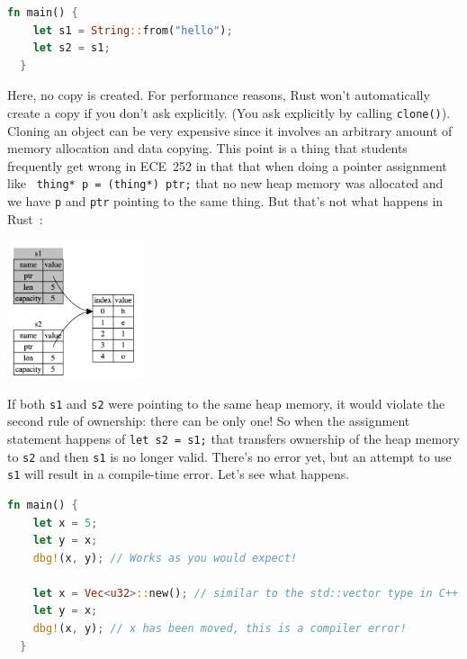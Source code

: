 \begin{lstlisting}[language=Rust]
  fn main() {
    let s1 = String::from("hello");
    let s2 = s1;
  }
\end{lstlisting}

Here, no copy is created. For performance reasons, Rust won't automatically create a copy if you don't ask explicitly. (You ask explicitly by calling \texttt{clone()}). Cloning an object can be very expensive since it involves an arbitrary amount of memory allocation and data copying. This point is a thing that students frequently get wrong in ECE~252 in that that when doing a pointer assignment like \texttt{ thing* p = (thing*) ptr;} that no new heap memory was allocated and we have \texttt{p} and \texttt{ptr} pointing to the same thing. But that's not what happens in Rust~\cite{rustdocs}:

\begin{center}
\includegraphics[width=0.3\textwidth]{images/string-rust.png}
\end{center}

If both \texttt{s1} and \texttt{s2} were pointing to the same heap memory, it would violate the second rule of ownership: there can be only one! So when the assignment statement happens of \texttt{let s2 = s1;} that transfers ownership of the heap memory to \texttt{s2} and then \texttt{s1} is no longer valid. There's no error yet, but an attempt to use \texttt{s1} will result in a compile-time error. Let's see what happens.

\begin{lstlisting}[language=Rust]
  fn main() {
    let x = 5;
    let y = x;
    dbg!(x, y); // Works as you would expect!

    let x = Vec<u32>::new(); // similar to the std::vector type in C++
    let y = x;
    dbg!(x, y); // x has been moved, this is a compiler error!
  }
\end{lstlisting}


